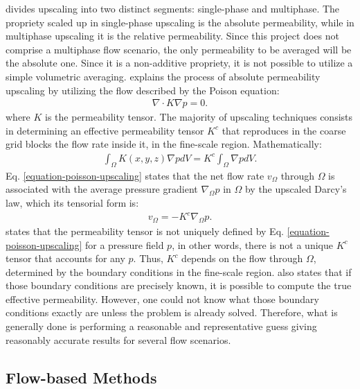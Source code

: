 \cite{Lie2015} divides upscaling into two distinct segments: single-phase and multiphase.
%
The propriety scaled up in single-phase upscaling is the absolute permeability, while in multiphase upscaling it is the relative permeability.
%
Since this project does not comprise a multiphase flow scenario, the only permeability to be averaged will be the absolute one.
%
Since it is a non-additive propriety, it is not possible to utilize a simple volumetric averaging.
%
\cite{Lie2015} explains the process of absolute permeability upscaling by utilizing the flow described by the Poison equation:
%
%
\begin{align}
	\label{equation-poisson}
	\nabla \cdot K \nabla p = 0.
\end{align}
\noindent
%
where $K$ is the permeability tensor. 
%
The majority of upscaling techniques consists in determining an effective permeability tensor $K^c$ that reproduces in the coarse grid blocks the flow rate inside it, in the fine-scale region. Mathematically:
%
\begin{align}
	\label{equation-poisson-upscaling}
	\int_{\Omega}K(x,y,z)\nabla p dV=K^c \int_{\Omega}\nabla p dV.
\end{align}
\noindent
%
Eq. \ref{equation-poisson-upscaling} states that the net flow rate $v_\Omega$ through $\Omega$ is associated with the average pressure gradient $\nabla_\Omega p$ in $\Omega$ by the upscaled Darcy's law, which its tensorial form is:
%
\begin{align}
	\label{equation-flow-rate-tensorial}
	v_\Omega=-K^c\nabla_\Omega p.
\end{align}
\noindent
%
\cite{Lie2015} states that the permeability tensor is not uniquely defined by Eq. \ref{equation-poisson-upscaling} for a pressure field $p$, in other words, there is not a unique $K^c$ tensor that accounts for any $p$. 
%
Thus, $K^c$ depends on the flow through $\Omega$, determined by the boundary conditions in the fine-scale region. 
%
\cite{Lie2015} also states that if those boundary conditions are precisely known, it is possible to compute the true effective permeability. 
%
However, one could not know what those boundary conditions exactly are unless the problem is already solved. 
%
Therefore, what is generally done is performing a reasonable and representative guess giving reasonably accurate results for several flow scenarios.

\subsection{Flow-based Methods}

